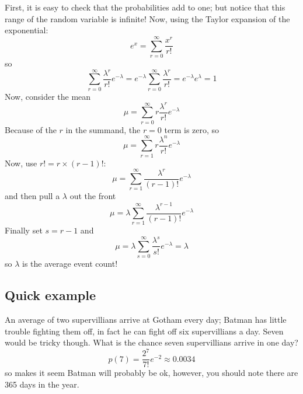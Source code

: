 \documentclass[11pt,a4paper]{scrartcl}
\begin{document}
First, it is easy to check that the probabilities add to one; but
notice that this range of the random variable is infinite!
Now, using the Taylor expansion of the exponential:
\begin{equation}
e^x=\sum_{r=0}^\infty \frac{x^r}{r!}
\end{equation}
so
\begin{equation}
\sum_{r=0}^\infty \frac{\lambda^r}{r!}e^{-\lambda}=e^{-\lambda}\sum_{r=0}^\infty \frac{\lambda^r}{r!}=e^{-\lambda}e^{\lambda}=1
\end{equation}
Now, consider the mean
\begin{equation}
\mu = \sum_{r=0}^\infty r\frac{\lambda^r}{r!}e^{-\lambda}
\end{equation}
Because of the $r$ in the summand, the $r=0$ term is zero, so
\begin{equation}
\mu = \sum_{r=1}^\infty r\frac{\lambda^n}{r!}e^{-\lambda}
\end{equation}
Now, use $r!=r\times (r-1)!$:
\begin{equation}
\mu = \sum_{r=1}^\infty \frac{\lambda^r}{(r-1)!}e^{-\lambda}
\end{equation}
and then pull a $\lambda$ out the front
\begin{equation}
\mu = \lambda \sum_{r=1}^\infty \frac{\lambda^{r-1}}{(r-1)!}e^{-\lambda}
\end{equation}
Finally set $s=r-1$ and
\begin{equation}
\mu = \lambda \sum_{s=0}^\infty \frac{\lambda^s}{s!}e^{-\lambda}=\lambda
\end{equation}
so $\lambda$ is the average event count!

\subsection*{Quick example}

An average of two supervillians arrive at Gotham every day; Batman has little trouble fighting them off, in fact he can fight off six supervillians a day. Seven would be tricky though. What is the chance seven supervillians arrive in one day?
\begin{equation}
p(7)=\frac{2^7}{7!}e^{-2}\approx 0.0034
\end{equation}
so makes it seem Batman will probably be ok, however, you should note
there are 365 days in the year.
\end{document}
